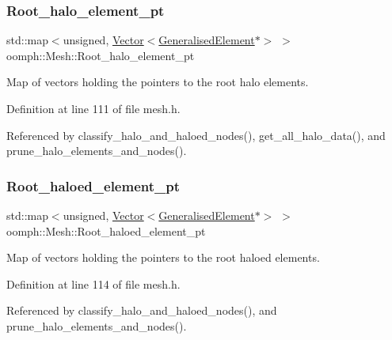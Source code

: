 \subsubsection{\texorpdfstring{Root\+\_\+halo\+\_\+element\+\_\+pt}{Root\_halo\_element\_pt}}
{\footnotesize\ttfamily std\+::map$<$unsigned, \hyperlink{classoomph_1_1Vector}{Vector}$<$\hyperlink{classoomph_1_1GeneralisedElement}{Generalised\+Element}$\ast$$>$ $>$ oomph\+::\+Mesh\+::\+Root\+\_\+halo\+\_\+element\+\_\+pt\hspace{0.3cm}{\ttfamily [protected]}}



Map of vectors holding the pointers to the root halo elements. 



Definition at line 111 of file mesh.\+h.



Referenced by classify\+\_\+halo\+\_\+and\+\_\+haloed\+\_\+nodes(), get\+\_\+all\+\_\+halo\+\_\+data(), and prune\+\_\+halo\+\_\+elements\+\_\+and\+\_\+nodes().

\mbox{\label{classoomph_1_1Mesh_a205ef660e5763d553053075a254db2a7}} 
\subsubsection{\texorpdfstring{Root\+\_\+haloed\+\_\+element\+\_\+pt}{Root\_haloed\_element\_pt}}
{\footnotesize\ttfamily std\+::map$<$unsigned, \hyperlink{classoomph_1_1Vector}{Vector}$<$\hyperlink{classoomph_1_1GeneralisedElement}{Generalised\+Element}$\ast$$>$ $>$ oomph\+::\+Mesh\+::\+Root\+\_\+haloed\+\_\+element\+\_\+pt\hspace{0.3cm}{\ttfamily [protected]}}



Map of vectors holding the pointers to the root haloed elements. 



Definition at line 114 of file mesh.\+h.



Referenced by classify\+\_\+halo\+\_\+and\+\_\+haloed\+\_\+nodes(), and prune\+\_\+halo\+\_\+elements\+\_\+and\+\_\+nodes().

\mbox{\label{classoomph_1_1Mesh_a0fba80dc38b8577982b94309e4e1d3d7}} 
